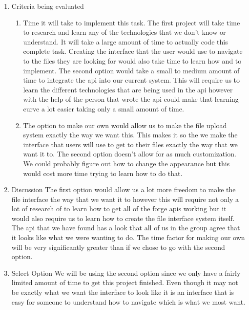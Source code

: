 \documentclass[letterpaper, 10pt, draftclsnofoot, compsoc, onecolumn]{IEEEtran}
\begin{document}
\begin{enumerate}
\begin{itemize}
				\end{itemize}
			\item{Criteria being evaluated}
				\begin{enumerate}
					\item Time it will take to implement this task. The first project will take time to research and learn any of the technologies that we don't know or understand.
						It will take a large amount of time to actually code this complete task. Creating the interface that the user would use to navigate to the files they are 
						looking for would also take time to learn how and to implement. The second option would take a small to medium amount of time to integrate the api into
						our current system. This will require us to learn the different technologies that are being used in the api however with the help of the person that wrote 
						the api could make that learning curve a lot easier taking only a small amount of time.
					\item The option to make our own would allow us to make the file upload system exactly the way we want this. This makes it so the we make the interface that
						users will use to get to their files exactly the way that we want it to. The second option doesn't allow for as much customization. We could probably figure out
						how to change the appearance but this would cost more time trying to learn how to do that.
				\end{enumerate}
			\item{Discussion} The first option would allow us a lot more freedom to make the file interface the way that we want it to however this will require not only a lot of research of 
						to learn how to get all of the forge apis working but it would also require us to learn how to create the file interface system itself. The api that we have found
						has a look that all of us in the group agree that it looks like what we were wanting to do. The time factor for making our own will be very significantly greater than
						if we chose to go with the second option. 
			\item{Select Option} We will be using the second option since we only have a fairly limited amount of time to get this project finished. Even though it may not be exactly what we want
						 the interface to look like it is an interface that is easy for someone to understand how to navigate which is what we most want.
					
		\end{enumerate}
\end{document}

